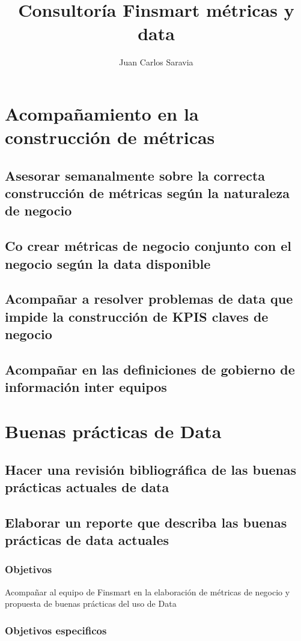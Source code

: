 \documentclass{beamer}
\title{Consultoría Finsmart métricas y data}
\author{Juan Carlos Saravia}
\date{}
\begin{document}
\begin{frame}
\titlepage
\end{frame}


\section{Acompañamiento en la construcción de métricas}
\subsection{Asesorar semanalmente sobre la correcta construcción de métricas según la naturaleza de negocio}
\subsection{Co crear métricas de negocio conjunto con el negocio según la data disponible}
\subsection{Acompañar a resolver problemas de data que impide la construcción de KPIS claves de negocio}
\subsection{Acompañar en las definiciones de gobierno de información inter equipos}


\section{Buenas prácticas de Data}
\subsection{Hacer una revisión bibliográfica de las buenas prácticas actuales de data}
\subsection{Elaborar un reporte que describa las buenas prácticas de data actuales}

\begin{frame}
\frametitle{Objetivos}
Acompañar al equipo de Finsmart en la elaboración de métricas de negocio y propuesta de buenas prácticas del uso de Data
\end{frame}



\begin{frame}
\frametitle{Objetivos especificos}
\tableofcontents
\end{frame}
\end{document}
